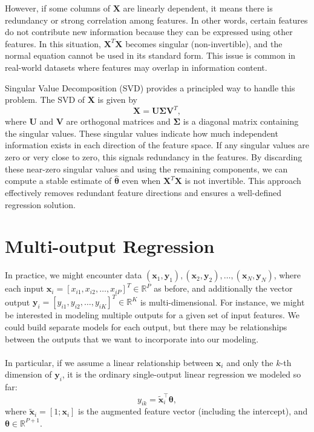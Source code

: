 \documentclass{article}
\begin{document}
However, if some columns of $\mathbf{X}$ are linearly dependent, it means there is redundancy or strong correlation among features. In other words, certain features do not contribute new information because they can be expressed using other features. In this situation, $\mathbf{X}^T \mathbf{X}$ becomes singular (non-invertible), and the normal equation cannot be used in its standard form. This issue is common in real-world datasets where features may overlap in information content.

Singular Value Decomposition (SVD) provides a principled way to handle this problem. The SVD of $\mathbf{X}$ is given by
\[
\mathbf{X} = \mathbf{U}\boldsymbol{\Sigma}\mathbf{V}^T,
\]
where $\mathbf{U}$ and $\mathbf{V}$ are orthogonal matrices and $\boldsymbol{\Sigma}$ is a diagonal matrix containing the singular values. These singular values indicate how much independent information exists in each direction of the feature space. If any singular values are zero or very close to zero, this signals redundancy in the features. By discarding these near-zero singular values and using the remaining components, we can compute a stable estimate of $\hat{\boldsymbol{\theta}}$ even when $\mathbf{X}^T \mathbf{X}$ is not invertible. This approach effectively removes redundant feature directions and ensures a well-defined regression solution.


\section{Multi-output Regression}

In practice, we might encounter data $(\mathbf{x}_1, \mathbf{y}_1), (\mathbf{x}_2, \mathbf{y}_2), \ldots, (\mathbf{x}_N, \mathbf{y}_N)$, where each input $\mathbf{x}_i = [x_{i1}, x_{i2}, \ldots, x_{iP}]^T \in \mathbb{R}^P$ as before, and additionally the vector output $\mathbf{y}_i = [y_{i1}, y_{i2}, \ldots, y_{iK}]^T \in \mathbb{R}^K$ is multi-dimensional. For instance, we might be interested in modeling multiple outputs for a given set of input features. We could build separate models for each output, but there may be relationships between the outputs that we want to incorporate into our modeling.\\ \\
In particular, if we assume a linear relationship between $\mathbf{x}_i$ and only the $k$-th dimension of $\mathbf{y}_i$, it is the ordinary single-output linear regression we modeled so far:
\[
y_{ik} = \tilde{\mathbf{x}}_i^\top \boldsymbol{\theta},
\]
where $\tilde{\mathbf{x}}_i = [1;\mathbf{x}_i]$ is the augmented feature vector (including the intercept), and $\boldsymbol{\theta}\in\mathbb{R}^{P+1}$.
\end{document}
